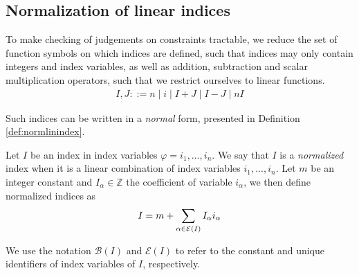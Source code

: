 


\subsection{Normalization of linear indices}

To make checking of judgements on constraints tractable, we reduce the set of function symbols on which indices are defined, such that indices may only contain integers and index variables, as well as addition, subtraction and scalar multiplication operators, such that we restrict ourselves to linear functions.
\begin{align*}
        I,J ::= n \mid i \mid I + J \mid I - J \mid n I
    \end{align*}


Such indices can be written in a \textit{normal} form, presented in Definition \ref{def:normlinindex}.

\begin{defi}\label{def:normlinindex}
    Let $I$ be an index in index variables $\varphi = i_1,\dots,i_n$. We say that $I$ is a \textit{normalized} index when it is a linear combination of index variables $i_1, ..., i_n$. Let $m$ be an integer constant and $I_\alpha\in\mathbb{Z}$ the coefficient of variable $i_\alpha$, we then define normalized indices as
    \begin{align*}
        I = m + \sum_{\alpha\in \mathcal{E}(I)} I_\alpha i_\alpha
    \end{align*}
    
    
    We use the notation $\mathcal{B}(I)$ and $\mathcal{E}(I)$ to refer to the constant and unique identifiers of index variables of $I$, respectively.
\end{defi}


